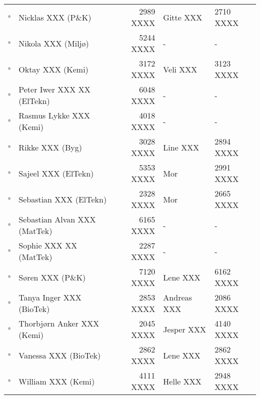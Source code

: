 \begin{table}[H]
\begin{tabu}{l l r l l}
$\square$ & Nicklas XXX (P\&K)                       & 2989 XXXX & Gitte XXX         & 2710 XXXX  \\
$\square$ & Nikola XXX (Miljø)                     & 5244 XXXX & -                     & -         \\
$\square$ & Oktay XXX (Kemi)                            & 3172 XXXX & Veli XXX             & 3123 XXXX  \\
$\square$ & Peter Iwer XXX XX (ElTekn)         & 6048 XXXX & -                     & -         \\
$\square$ & Rasmus Lykke XXX (Kemi)                & 4018 XXXX & -                     & -         \\
$\square$ & Rikke XXX (Byg)                         & 3028 XXXX & Line XXX         & 2894 XXXX  \\
$\square$ & Sajeel XXX (ElTekn)                      & 5353 XXXX & Mor                   & 2991 XXXX  \\
$\square$ & Sebastian XXX (ElTekn)               & 2328 XXXX & Mor                   & 2665 XXXX  \\
$\square$ & Sebastian Alvan XXX (MatTek)          & 6165 XXXX & -                     & - \\
$\square$ & Sophie XXX XX (MatTek)        & 2287 XXXX & -                     & -         \\
$\square$ & Søren XXX (P\&K)                       & 7120 XXXX & Lene XXX        & 6162 XXXX  \\
$\square$ & Tanya Inger XXX (BioTek)         & 2853 XXXX & Andreas XXX    & 2086 XXXX  \\
$\square$ & Thorbjørn Anker XXX (Kemi)              & 2045 XXXX & Jesper XXX       & 4140 XXXX  \\
$\square$ & Vanessa XXX (BioTek)                & 2862 XXXX & Lene XXX     & 2862 XXXX  \\
$\square$ & William XXX (Kemi)                      & 4111 XXXX & Helle XXX          & 2948 XXXX  \\

\end{tabu}
\end{table}